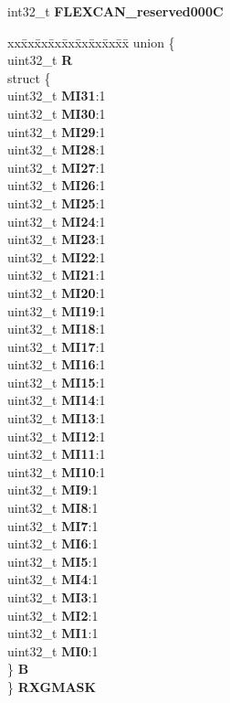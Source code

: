 \begin{DoxyCompactItemize}
\begin{tabbing}
\end{tabbing}\item 
\mbox{\label{structFLEXCAN2__tag_a09d7be05aa125a55aab3f9c6b7311237}} 
int32\+\_\+t {\bfseries F\+L\+E\+X\+C\+A\+N\+\_\+reserved000C}
\item 
\mbox{\label{structFLEXCAN2__tag_a74dd3de03de94622c494ed2fd3201ba0}} 
\begin{tabbing}
xx\=xx\=xx\=xx\=xx\=xx\=xx\=xx\=xx\=\kill
union \{\\
\>uint32\_t {\bfseries R}\\
\>struct \{\\
\>\>uint32\_t {\bfseries MI31}:1\\
\>\>uint32\_t {\bfseries MI30}:1\\
\>\>uint32\_t {\bfseries MI29}:1\\
\>\>uint32\_t {\bfseries MI28}:1\\
\>\>uint32\_t {\bfseries MI27}:1\\
\>\>uint32\_t {\bfseries MI26}:1\\
\>\>uint32\_t {\bfseries MI25}:1\\
\>\>uint32\_t {\bfseries MI24}:1\\
\>\>uint32\_t {\bfseries MI23}:1\\
\>\>uint32\_t {\bfseries MI22}:1\\
\>\>uint32\_t {\bfseries MI21}:1\\
\>\>uint32\_t {\bfseries MI20}:1\\
\>\>uint32\_t {\bfseries MI19}:1\\
\>\>uint32\_t {\bfseries MI18}:1\\
\>\>uint32\_t {\bfseries MI17}:1\\
\>\>uint32\_t {\bfseries MI16}:1\\
\>\>uint32\_t {\bfseries MI15}:1\\
\>\>uint32\_t {\bfseries MI14}:1\\
\>\>uint32\_t {\bfseries MI13}:1\\
\>\>uint32\_t {\bfseries MI12}:1\\
\>\>uint32\_t {\bfseries MI11}:1\\
\>\>uint32\_t {\bfseries MI10}:1\\
\>\>uint32\_t {\bfseries MI9}:1\\
\>\>uint32\_t {\bfseries MI8}:1\\
\>\>uint32\_t {\bfseries MI7}:1\\
\>\>uint32\_t {\bfseries MI6}:1\\
\>\>uint32\_t {\bfseries MI5}:1\\
\>\>uint32\_t {\bfseries MI4}:1\\
\>\>uint32\_t {\bfseries MI3}:1\\
\>\>uint32\_t {\bfseries MI2}:1\\
\>\>uint32\_t {\bfseries MI1}:1\\
\>\>uint32\_t {\bfseries MI0}:1\\
\>\} {\bfseries B}\\
\} {\bfseries RXGMASK}\\


\end{tabbing}
\end{DoxyCompactItemize}
